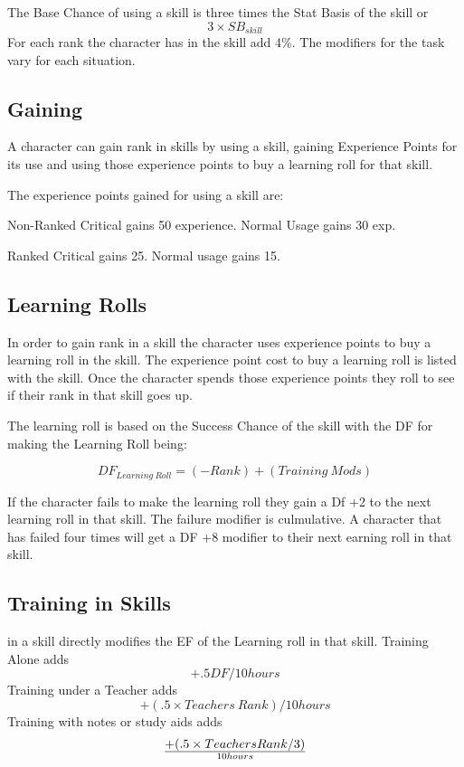 The Base Chance of using a skill is three times the Stat Basis of the skill
or \[ 3 \times SB_{skill} \] For each rank the character has in the skill add 4\%.
The modifiers for the task vary for each situation.


\subsection{Gaining}
A character can gain rank in skills by using a skill, gaining Experience Points
for its use and using those experience points to buy a learning roll for that
skill. 

The experience points gained for using a skill are:

\begin{relate}
	\item[Non-Ranked] Critical gains 50 experience. Normal Usage gains 30 exp.
	\item[Ranked] Critical gains 25. Normal usage gains 15.
\end{relate}

\subsection{Learning Rolls}

In order to gain rank in a skill the character uses experience points to
buy a learning roll in the skill. The experience point cost to buy a learning roll
is listed with the skill. Once the character spends
those experience points they roll to see if their rank in that
skill goes up.

The learning roll is based on the Success Chance of the skill with the  
DF for making the Learning Roll being: 

\[DF_{Learning\ Roll} = (-Rank) + ({Training\ Mods})\]

If the character fails to make the learning roll they gain a Df +2 to the next 
learning roll in that skill. The failure modifier is culmulative. A character
that has failed four times will get a DF +8 modifier to their next earning roll
in that skill.

\subsection{Training in Skills}

 in a skill directly modifies the EF of the Learning roll in
that skill. Training Alone adds \[+.5 DF/10 hours\] 
Training under a Teacher adds \[+(.5 \times {Teachers\ Rank})/10 hours\]
Training with notes or study aids adds \[+(.5 \times {Teachers Rank}/3) \over {10 hours}\]

